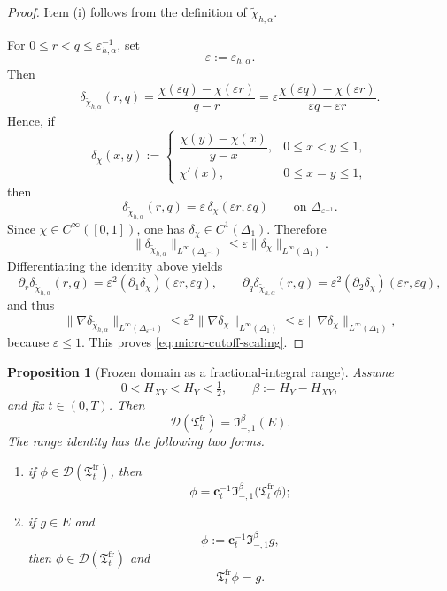 \documentclass[11pt,a4paper]{amsart}
\theoremstyle{plain}
\newtheorem{proposition}[theorem]{Proposition}
\theoremstyle{definition}
\theoremstyle{remark}
\begin{document}
\begin{proof}
Item (i) follows from the definition of \(\widetilde\chi_{h,\alpha}\).

For \(0\le r<q\le \varepsilon_{h,\alpha}^{-1}\), set
\[
\varepsilon:=\varepsilon_{h,\alpha}.
\]
Then
\[
\delta_{\widetilde\chi_{h,\alpha}}(r,q)
=
\frac{\chi(\varepsilon q)-\chi(\varepsilon r)}{q-r}
=
\varepsilon
\frac{\chi(\varepsilon q)-\chi(\varepsilon r)}{\varepsilon q-\varepsilon r}.
\]
Hence, if
\[
\delta_\chi(x,y)
:=
\begin{cases}
\dfrac{\chi(y)-\chi(x)}{y-x}, & 0\le x<y\le 1,\\[1ex]
\chi'(x), & 0\le x=y\le 1,
\end{cases}
\]
then
\[
\delta_{\widetilde\chi_{h,\alpha}}(r,q)
=
\varepsilon\,\delta_\chi(\varepsilon r,\varepsilon q)
\qquad\text{on }\Delta_{\varepsilon^{-1}}.
\]
Since \(\chi\in C^\infty([0,1])\), one has \(\delta_\chi\in C^1(\Delta_1)\). Therefore
\[
\|\delta_{\widetilde\chi_{h,\alpha}}\|_{L^\infty(\Delta_{\varepsilon^{-1}})}
\le
\varepsilon \|\delta_\chi\|_{L^\infty(\Delta_1)}.
\]
Differentiating the identity above yields
\[
\partial_r\delta_{\widetilde\chi_{h,\alpha}}(r,q)
=
\varepsilon^2 (\partial_1\delta_\chi)(\varepsilon r,\varepsilon q),
\qquad
\partial_q\delta_{\widetilde\chi_{h,\alpha}}(r,q)
=
\varepsilon^2 (\partial_2\delta_\chi)(\varepsilon r,\varepsilon q),
\]
and thus
\[
\|\nabla \delta_{\widetilde\chi_{h,\alpha}}\|_{L^\infty(\Delta_{\varepsilon^{-1}})}
\le
\varepsilon^2 \|\nabla \delta_\chi\|_{L^\infty(\Delta_1)}
\le
\varepsilon \|\nabla \delta_\chi\|_{L^\infty(\Delta_1)},
\]
because \(\varepsilon\le1\). This proves \eqref{eq:micro-cutoff-scaling}.
\end{proof}

\begin{proposition}[Frozen domain as a fractional-integral range]
\label{prop:frozen-range}
Assume
\[
0<H_{XY}<H_Y<\tfrac12,
\qquad
\beta:=H_Y-H_{XY},
\]
and fix \(t\in(0,T)\). Then
\begin{equation}\label{eq:frozen-range}
\mathcal D(\mathfrak T_t^{\mathrm{fr}})
=
\mathfrak I_{-,1}^{\beta}(E).
\end{equation}
The range identity has the following two forms.
\begin{enumerate}[label=(\roman*)]
\item if \(\phi\in\mathcal D(\mathfrak T_t^{\mathrm{fr}})\), then
\begin{equation}\label{eq:frozen-range-forward}
\phi
=
\mathbf c_t^{-1}\mathfrak I_{-,1}^{\beta}\bigl(\mathfrak T_t^{\mathrm{fr}}\phi\bigr);
\end{equation}
\item if \(g\in E\) and
\[
\phi:=\mathbf c_t^{-1}\mathfrak I_{-,1}^{\beta}g,
\]
then \(\phi\in\mathcal D(\mathfrak T_t^{\mathrm{fr}})\) and
\begin{equation}\label{eq:frozen-range-backward}
\mathfrak T_t^{\mathrm{fr}}\phi=g.
\end{equation}
\end{enumerate}
\end{proposition}
\end{document}
